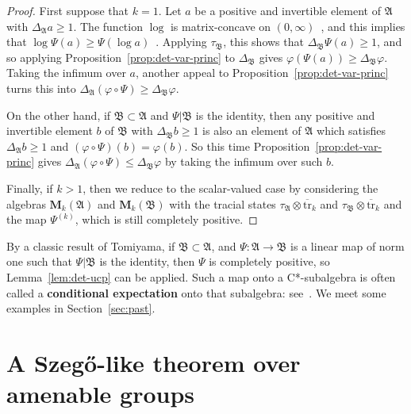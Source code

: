 \documentclass[12pt,a4paper]{article}
\numberwithin{equation}{section}
\theoremstyle{remark}
\newcommand{\rmM}{\mathbf{M}}
\newcommand{\A}{\mathfrak{A}}
\newcommand{\B}{\mathfrak{B}}
\renewcommand{\phi}{\varphi}
\newcommand{\tr}{\overline{\mathrm{tr}}}
\begin{document}
\begin{proof}
First suppose that $k=1$.  Let $a$ be a positive and invertible element of $\A$ with $\Delta_\A a \ge 1$.  The function $\log$ is matrix-concave on $(0,\infty)$~\cite[Prob. 6.6.18]{HorJohTMA}, and this implies that $\log \Psi(a) \ge \Psi(\log a)$~\cite[Thm. 2.1]{Choi74}.  Applying $\tau_\B$, this shows that $\Delta_\B \Psi(a) \ge 1$, and so applying Proposition~\ref{prop:det-var-princ} to $\Delta_\B$ gives $\phi(\Psi(a)) \ge \Delta_\B\phi$.  Taking the infimum over $a$, another appeal to Proposition~\ref{prop:det-var-princ} turns this into $\Delta_\A (\phi\circ \Psi) \ge \Delta_\B\phi$.

On the other hand, if $\B \subset \A$ and $\Psi|\B$ is the identity, then any positive and invertible element $b$ of $\B$ with $\Delta_\B b \ge 1$ is also an element of $\A$ which satisfies $\Delta_\A b \ge 1$ and $(\phi\circ \Psi)(b) = \phi(b)$.  So this time Proposition~\ref{prop:det-var-princ} gives $\Delta_\A (\phi\circ \Psi) \le \Delta_\B\phi$ by taking the infimum over such $b$.

Finally, if $k > 1$, then we reduce to the scalar-valued case by considering the algebras $\rmM_k(\A)$ and $\rmM_k(\B)$ with the tracial states $\tau_\A\otimes \tr_k$ and $\tau_\B\otimes \tr_k$ and the map $\Psi^{(k)}$, which is still completely positive.
\end{proof}

By a classic result of Tomiyama, if $\B\subset \A$, and $\Psi:\A\to \B$ is a linear map of norm one such that $\Psi|\B$ is the identity, then $\Psi$ is completely positive, so Lemma~\ref{lem:det-ucp} can be applied.  Such a map onto a C*-subalgebra is often called a \textbf{conditional expectation} onto that subalgebra: see~\cite[Sec. 1.5]{BroOza08}.  We meet some examples in Section~\ref{sec:past}. %


























\section{A Szeg\H{o}-like theorem over amenable groups}\label{sec:amenable}
\end{document}

